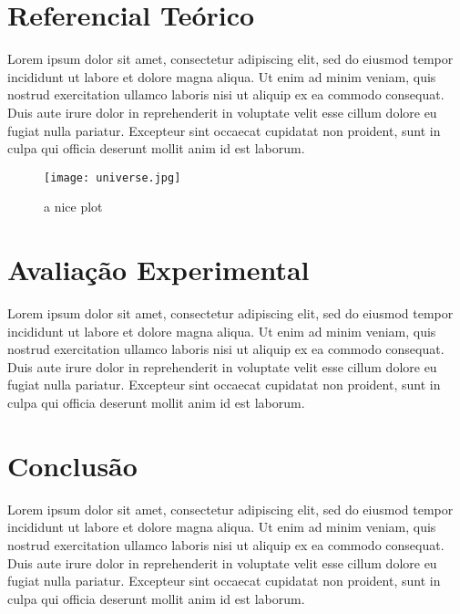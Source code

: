 \documentclass[10pt, a4paper,twocolumn]{article}
\begin{document}
\section{Referencial Teórico}
Lorem ipsum dolor sit amet, consectetur adipiscing elit, sed do eiusmod tempor incididunt ut labore et dolore magna aliqua. Ut enim ad minim veniam, quis nostrud exercitation ullamco laboris nisi ut aliquip ex ea commodo consequat. Duis aute irure dolor in reprehenderit in voluptate velit esse cillum dolore eu fugiat nulla pariatur. Excepteur sint occaecat cupidatat non proident, sunt in culpa qui officia deserunt mollit anim id est laborum.

\begin{figure}[h]
    \centering
    \texttt{[image: universe.jpg]}
    \caption{a nice plot}
    \label{fig:mesh1}
\end{figure}

\section{Avaliação Experimental}
Lorem ipsum dolor sit amet, consectetur adipiscing elit, sed do eiusmod tempor incididunt ut labore et dolore magna aliqua. Ut enim ad minim veniam, quis nostrud exercitation ullamco laboris nisi ut aliquip ex ea commodo consequat. Duis aute irure dolor in reprehenderit in voluptate velit esse cillum dolore eu fugiat nulla pariatur. Excepteur sint occaecat cupidatat non proident, sunt in culpa qui officia deserunt mollit anim id est laborum.

\section{Conclusão}
Lorem ipsum dolor sit amet, consectetur adipiscing elit, sed do eiusmod tempor incididunt ut labore et dolore magna aliqua. Ut enim ad minim veniam, quis nostrud exercitation ullamco laboris nisi ut aliquip ex ea commodo consequat. Duis aute irure dolor in reprehenderit in voluptate velit esse cillum dolore eu fugiat nulla pariatur. Excepteur sint occaecat cupidatat non proident, sunt in culpa qui officia deserunt mollit anim id est laborum.

\printbibliography
\end{document}
